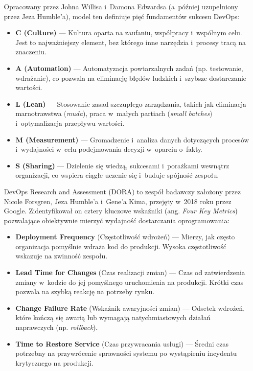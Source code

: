 \begin{description}[font=\bfseries]
    \item[Model CALMS] \cite{Kim2021DevOpsHandbook,Maroukian2020DevOpsAdoption} Opracowany przez Johna Willisa i~Damona Edwardsa (a~później uzupełniony przez Jeza Humble'a), model ten definiuje pięć fundamentów sukcesu DevOps:
          \begin{itemize}
              \item \textbf{C (Culture)} --- Kultura oparta na zaufaniu, współpracy i~wspólnym celu. Jest to najważniejszy element, bez którego inne narzędzia i~procesy tracą na znaczeniu.
              \item \textbf{A (Automation)} --- Automatyzacja powtarzalnych zadań (np. testowanie, wdrażanie), co pozwala na eliminację błędów ludzkich i~szybsze dostarczanie wartości.
              \item \textbf{L (Lean)} --- Stosowanie zasad szczupłego zarządzania, takich jak eliminacja marnotrawstwa (\textit{muda}), praca w~małych partiach (\textit{small batches}) i~optymalizacja przepływu wartości.
              \item \textbf{M (Measurement)} --- Gromadzenie i~analiza danych dotyczących procesów i~wydajności w~celu podejmowania decyzji w~oparciu o~fakty.
              \item \textbf{S (Sharing)} --- Dzielenie się wiedzą, sukcesami i~porażkami wewnątrz organizacji, co wspiera ciągłe uczenie się i~buduje spójność zespołu.
          \end{itemize}

    \item[Metryki DORA] \cite{Google2022StateOfDevOps,DoraCapabilities} DevOps Research and Assessment (DORA) to zespół badawczy założony przez Nicole Forsgren, Jeza Humble'a i~Gene'a Kima, przejęty w~2018 roku przez Google.
          Zidentyfikował on cztery kluczowe wskaźniki (ang. \textit{Four Key Metrics}) pozwalające obiektywnie mierzyć wydajność dostarczania oprogramowania:
          \begin{itemize}
              \item \textbf{Deployment Frequency} (Częstotliwość wdrożeń) --- Mierzy, jak często organizacja pomyślnie wdraża kod do produkcji. Wysoka częstotliwość wskazuje na zwinność zespołu.
              \item \textbf{Lead Time for Changes} (Czas realizacji zmian) --- Czas od zatwierdzenia zmiany w~kodzie do jej pomyślnego uruchomienia na produkcji. Krótki czas pozwala na szybką reakcję na potrzeby rynku.
              \item \textbf{Change Failure Rate} (Wskaźnik awaryjności zmian) --- Odsetek wdrożeń, które kończą się awarią lub wymagają natychmiastowych działań naprawczych (np. \textit{rollback}).
              \item \textbf{Time to Restore Service} (Czas przywracania usługi) --- Średni czas potrzebny na przywrócenie sprawności systemu po wystąpieniu incydentu krytycznego na produkcji.
          \end{itemize}
\end{description}

